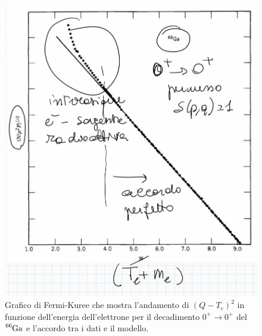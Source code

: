 \begin{figure}[h]
    \centering
    \includegraphics[scale=0.2]{Immagini/0304_andamenti3.png}
    \caption{Grafico di Fermi-Kuree che mostra l'andamento di $(Q-T_e)^2$ in funzione dell'energia dell'elettrone per il decadimento $0^+\to0^+$ del $\ce{^{66}Ga}$ e l'accordo tra i dati e il modello.}
    \label{0304_qvalue}
\end{figure}
